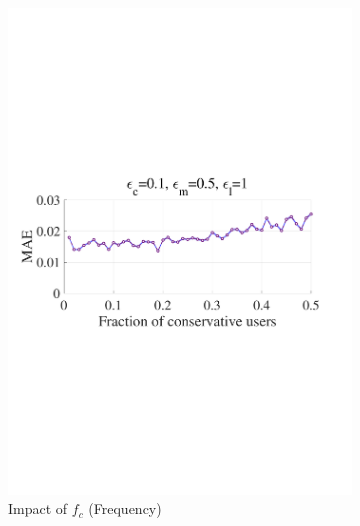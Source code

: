 \documentclass[letterpaper]{article} %
\begin{document}
\begin{figure}[htbp]
  \begin{subfigure}[b]{0.23\textwidth}
    \centering
    \includegraphics[width=\textwidth]{picture/MAEvsfc_freq.pdf}
    \caption{Impact of $f_c$ (Frequency)}
    \label{fig:sub3}
  \end{subfigure}
  \hfill
  \begin{subfigure}[b]{0.23\textwidth}
    \centering

\end{subfigure}
\end{figure}
\end{document}

